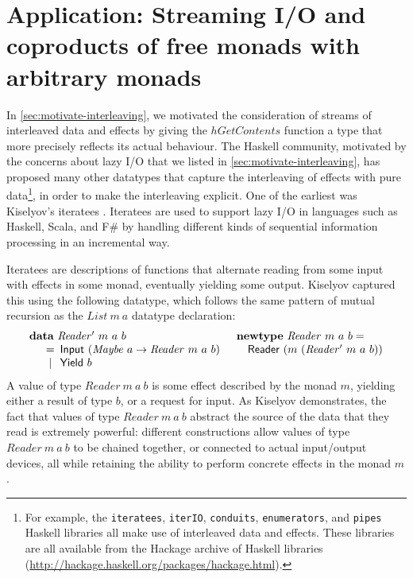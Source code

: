 \documentclass{jfp1}
\newcommand{\kw}[1]{\textbf{#1}}
\begin{document}
\section{Application: Streaming I/O and coproducts of free monads with arbitrary monads}
\label{sec:coproducts-with-free-monads}

In \autoref{sec:motivate-interleaving}, we motivated the consideration
of streams of interleaved data and effects by giving the
$\mathit{hGetContents}$ function a type that more precisely reflects
its actual behaviour. The Haskell community, motivated by the concerns
about lazy I/O that we listed in \autoref{sec:motivate-interleaving},
has proposed many other datatypes that capture the interleaving of
effects with pure data\footnote{For example, the \texttt{iteratees},
  \texttt{iterIO}, \texttt{conduits}, \texttt{enumerators}, and
  \texttt{pipes} Haskell libraries all make use of interleaved data
  and effects. These libraries are all available from the Hackage
  archive of Haskell libraries
  (\url{http://hackage.haskell.org/packages/hackage.html}).}, in order
to make the interleaving explicit. One of the earliest was Kiselyov's
iteratees \cite{kiselyov12iteratees}.  Iteratees are used to support
lazy I/O in languages such as Haskell, Scala, and F\# by handling
different kinds of sequential information processing in an incremental
way.

Iteratees are descriptions of functions that alternate reading from
some input with effects in some monad, eventually yielding some
output. Kiselyov captured this using the following datatype, which
follows the same pattern of mutual recursion as the
$\mathit{List}~m~a$ datatype declaration:
\begin{displaymath}
  \begin{array}{ll}
    \kw{data}~\mathit{Reader'}~m~a~b
    &
    \kw{newtype}~\mathit{Reader}~m~a~b = 
    \\
    \quad
    \begin{array}[t]{c@{\hspace{0.5em}}l}
      = & \mathsf{Input}~(\mathit{Maybe}~a \to \mathit{Reader}~m~a~b) \\
      | & \mathsf{Yield}~b
    \end{array}
    &
    \quad \mathsf{Reader}~(m~(\mathit{Reader'}~m~a~b))
  \end{array}
\end{displaymath}
A value of type $\mathit{Reader}~m~a~b$ is some effect described by
the monad $m$, yielding either a result of type $b$, or a request for
input. As Kiselyov demonstrates, the fact that values of type
$\mathit{Reader}~m~a~b$ abstract the source of the data that they read
is extremely powerful: different constructions allow values of type
$\mathit{Reader}~m~a~b$ to be chained together, or connected to actual
input/output devices, all while retaining the ability to perform
concrete effects in the monad $m$.
\end{document}
